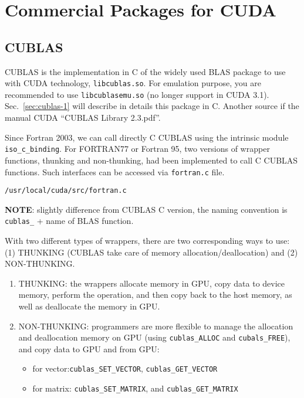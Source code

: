 

\chapter{Commercial Packages for CUDA}
\label{chap:comm-pack-cuda}


\section{CUBLAS}
\label{sec:cublas}

CUBLAS is the implementation in C of the widely used BLAS package to
use with CUDA technology, \verb!libcublas.so!. For emulation purpose,
you are recommended to use \verb!libcublasemu.so! (no longer support
in CUDA 3.1).  Sec.~\ref{sec:cublas-1} will describe in details this
package in C.  Another source if the manual CUDA ``CUBLAS Library
2.3.pdf''.

Since Fortran 2003, we can call directly C CUBLAS using the intrinsic
module \verb!iso_c_binding!. For FORTRAN77 or Fortran 95, two versions
of wrapper functions, thunking and non-thunking, had been implemented
to call C CUBLAS functions. Such interfaces can be accessed via
\verb!fortran.c!  file.
\begin{verbatim}
/usr/local/cuda/src/fortran.c
\end{verbatim}

{\bf NOTE}: slightly difference from CUBLAS C version, the naming
convention is \verb!cublas_! + name of BLAS function.

With two different types of wrappers, there are two corresponding ways
to use: (1) THUNKING (CUBLAS take care of memory
allocation/deallocation) and (2) NON-THUNKING.
\begin{enumerate}
\item THUNKING: the wrappers allocate memory in GPU, copy data to
  device memory, perform the operation, and then copy back to the host
  memory, as well as deallocate the memory in GPU.

\item NON-THUNKING: programmers are more flexible to manage the
  allocation and deallocation memory on GPU (using \verb!cublas_ALLOC!
  and \verb!cubals_FREE!), and copy data to GPU and from GPU:
  \begin{itemize}
  \item for vector:\verb!cublas_SET_VECTOR!, \verb!cublas_GET_VECTOR!
  \item for matrix: \verb!cublas_SET_MATRIX!, and
    \verb!cublas_GET_MATRIX!
  \end{itemize}
\end{enumerate}

